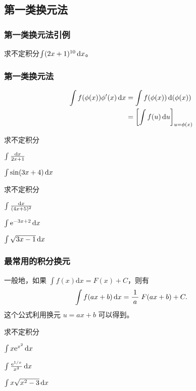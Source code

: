 \documentclass[14pt,notheorems,leqno,xcolor={rgb}]{beamer} %
\begin{document}
\subsection{第一类换元法}

\begin{frame}
\frametitle{第一类换元法引例}
\begin{example}
求不定积分$\int(2x+1)^{10}\mathop{}\!\mathrm{d} x$。
\end{example}
\end{frame}

\begin{frame}
\frametitle{第一类换元法}
\large\cbold\noindent
\begin{align*}
\int f(\phi(x))\phi'(x)\mathop{}\!\mathrm{d}{x} &= \int f(\phi(x))\mathop{}\!\mathrm{d}{(\phi(x))} \\
                          &= \left[\int f(u)\mathop{}\!\mathrm{d}{u}\right]_{u=\phi(x)}
\end{align*}
\end{frame}

\begin{frame}
\begin{example}
求不定积分
\begin{enumlite}
  \item $\int \frac{\mathop{}\!\mathrm{d}{x}}{2x+1}$
  \item $\int \sin(3x+4)\mathop{}\!\mathrm{d}{x}$
\end{enumlite}
\end{example}
\end{frame}

\begin{frame}
\begin{exercise}
求不定积分
\begin{enumlite}
  \item $\int \frac{\mathop{}\!\mathrm{d}{x}}{(4x+5)^2}$
  \item $\int \mathrm{e}^{-3x+2}\mathop{}\!\mathrm{d}{x}$
  \pause
  \item $\int \sqrt{3x-1}\mathop{}\!\mathrm{d}{x}$
\end{enumlite}
\end{exercise}
\end{frame}

\begin{frame}
\frametitle{最常用的积分换元}
一般地，如果 $\int f(x)\mathrm{d}x = F(x)+C$，则有 \pause
$$\int f(ax+b)\d x = \wfrac1a \; F(ax+b)+C.$$
\pause 这个公式利用换元 $u=ax+b$ 可以得到。
\end{frame}

\begin{frame}
\begin{example}
求不定积分
\begin{enumlite}
  \item $\int x \mathrm{e}^{x^2}\mathop{}\!\mathrm{d} x$
  \item $\int \frac{\mathrm{e}^{1/x}}{x^2}\mathop{}\!\mathrm{d} x$
  \pause
  \item $\int x\sqrt{x^2-3}\mathop{}\!\mathrm{d} x$
\end{enumlite}
\end{example}
\end{frame}
\end{document}
